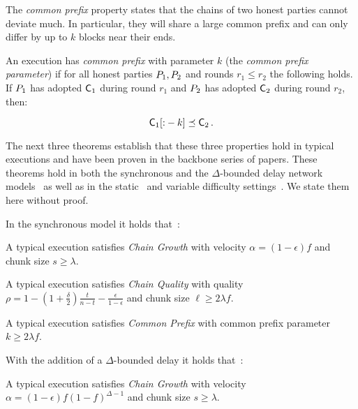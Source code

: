 The \emph{common prefix} property states that the chains of two honest parties
cannot deviate much. In particular, they will share a large common prefix and
can only differ by up to $k$ blocks near their ends.

\begin{definition}
  An execution has \emph{common prefix} with parameter $k$ (the \emph{common
  prefix parameter}) if for all honest parties $P_1, P_2$ and rounds
  $r_1 \leq r_2$ the following holds. If $P_1$ has adopted $\mathsf{C}_1$
  during round $r_1$ and $P_2$ has adopted $\mathsf{C}_2$ during round $r_2$,
  then:

  \[
  \mathsf{C}_1[{:}-k] \preceq \mathsf{C}_2
  \,.
  \]
\end{definition}

The next three theorems establish that these three properties hold in typical
executions and have been proven in the backbone series of papers. These theorems
hold in both the synchronous and the $\Delta$-bounded delay network
models~\cite{pass-asynchronous} as well as in the static~\cite{backbone} and
variable difficulty settings~\cite{varbackbone}. We state them here without
proof.

In the synchronous model it holds that~\cite{backbone}:

\begin{theorem}
  A typical execution satisfies \emph{Chain Growth} with
  velocity $\alpha = (1 - \epsilon)f$ and chunk size $s \geq \lambda$.
\end{theorem}

\begin{theorem}
  A typical execution satisfies \emph{Chain Quality} with quality
  $\rho = 1 - (1 + \frac{\delta}{2})\frac{t}{n - t} - \frac{\epsilon}{1 - \epsilon}$
  and chunk size $\ell \geq 2\lambda f$.
\end{theorem}

\begin{theorem}
  A typical execution satisfies \emph{Common Prefix} with common prefix
  parameter $k \geq 2\lambda f$.
\end{theorem}

With the addition of a $\Delta$-bounded delay it holds that~\cite{backbone-new}:

\begin{theorem}
  A typical execution satisfies \emph{Chain Growth} with
  velocity $\alpha = (1 - \epsilon)f(1 - f)^{\Delta - 1}$
  and chunk size $s \geq \lambda$.
\end{theorem}

